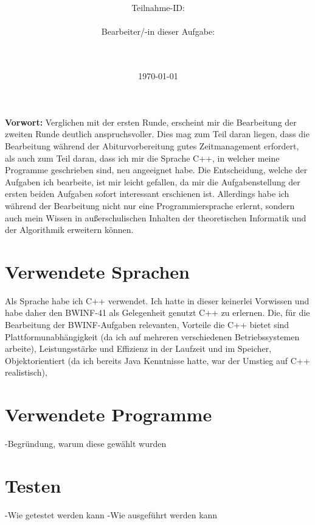 \documentclass[a4paper,10pt,ngerman]{scrartcl}
\title{\textbf{\Huge\Aufgabe}}
\author{\LARGE Teilnahme-ID: \LARGE \TeilnahmeId \\\\
\LARGE Bearbeiter/-in dieser Aufgabe: \\
\LARGE \Name\\\\}
\date{\LARGE\today}
\begin{document}
    \maketitle
    \tableofcontents

    \vspace{0.5cm}

    \textbf{Vorwort:}
    Verglichen mit der ersten Runde, erscheint mir die Bearbeitung der zweiten Runde deutlich anspruchsvoller.
    Dies mag zum Teil daran liegen, dass die Bearbeitung während der Abiturvorbereitung gutes Zeitmanagement erfordert,
    als auch zum Teil daran, dass ich mir die Sprache C++, in welcher meine Programme geschrieben sind, neu angeeignet habe.
    Die Entscheidung, welche der Aufgaben ich bearbeite, ist mir leicht gefallen, da mir die Aufgabenstellung der ersten beiden
    Aufgaben sofort interessant erschienen ist.
    Allerdings habe ich während der Bearbeitung nicht nur eine Programmiersprache erlernt,
    sondern auch mein Wissen in außerschulischen Inhalten der theoretischen Informatik und der Algorithmik erweitern können.


    \section{Verwendete Sprachen}
    Als Sprache habe ich C++ verwendet.
    Ich hatte in dieser keinerlei Vorwissen und habe daher den BWINF-41 als Gelegenheit genutzt C++ zu erlernen.
    Die, für die Bearbeitung der BWINF-Aufgaben relevanten, Vorteile die C++ bietet sind
    Plattformunabhängigkeit (da ich auf mehreren verschiedenen Betriebssystemen arbeite),
    Leistungsstärke und Effizienz in der Laufzeit und im Speicher,
    Objektorientiert (da ich bereits Java Kenntnisse hatte, war der Umstieg auf C++ realistisch),



    \section{Verwendete Programme}
    -Begründung, warum diese gewählt wurden

    \section{Testen}
    -Wie getestet werden kann
    -Wie ausgeführt werden kann
\end{document}
